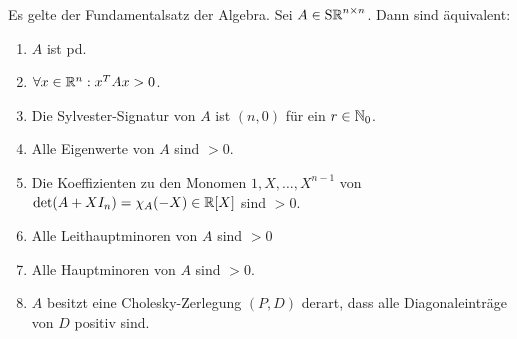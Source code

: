 \documentclass[../../main.tex]{subfiles}
\begin{document}
\begin{sat}\label{14.2.13}
Es gelte der Fundamentalsatz der Algebra. Sei $A\in\operatorname{S\mathbb R}^{n\times n}$. Dann sind äquivalent:
    \begin{enumerate}[\normalfont(a)]
        \item $A$ ist pd.
        \item $\forall x\in \mathbb R^n: x^TAx> 0$.
        \item Die Sylvester-Signatur von $A$ ist $(n,0)$ für ein $r\in \mathbb N_0$.
        \item Alle Eigenwerte von $A$ sind $> 0$.
        \item Die Koeffizienten zu den Monomen $1,X,\ldots ,X^{n-1}$ von $\det(A+XI_n)=\chi_A(-X)\in \mathbb R[X]$ sind $> 0$.
        \item Alle Leithauptminoren von $A$ sind $>0$
        \item Alle Hauptminoren von $A$ sind $>0$.
        \item $A$ besitzt eine Cholesky-Zerlegung $(P,D)$ derart, dass alle Diagonaleinträge von $D$ positiv sind.
    \end{enumerate}	 
\end{sat}
\end{document}
